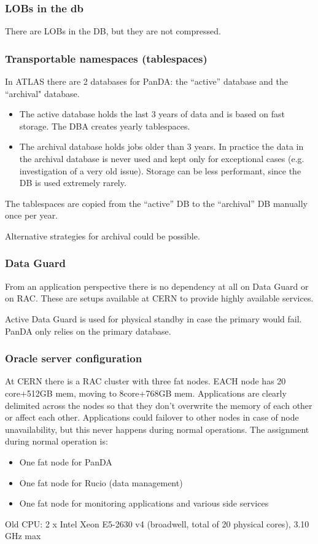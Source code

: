 \subsubsection{LOBs in the db}
There are LOBs in the DB, but they are not compressed.

\subsubsection{Transportable namespaces (tablespaces)}
In ATLAS there are 2 databases for PanDA: the “active” database and the “archival" database.
\begin{itemize}
    \item The active database holds the last 3 years of data and is based on fast storage. The DBA creates yearly tablespaces.
    \item The archival database holds jobs older than 3 years. In practice the data in the archival database is never used and kept only for exceptional cases (e.g. investigation of a very old issue). Storage can be less performant, since the DB is used extremely rarely.
\end{itemize}
The tablespaces are copied from the “active” DB to the “archival” DB manually once per year.

Alternative strategies for archival could be possible.

\subsubsection{Data Guard}
From an application perspective there is no dependency at all on Data Guard or on RAC. These are setups available at CERN to provide highly available services.

Active Data Guard is used for physical standby in case the primary would fail. PanDA only relies on the primary database.

\subsubsection{Oracle server configuration}
At CERN there is a RAC cluster with three fat nodes. EACH node has 20 core+512GB mem, moving to 8core+768GB mem. Applications are clearly delimited across the nodes so that they don’t overwrite the memory of each other or affect each other. Applications could failover to other nodes in case of node unavailability, but this never happens during normal operations. The assignment during normal operation is:
\begin{itemize}
    \item One fat node for PanDA
    \item One fat node for Rucio (data management)
    \item One fat node for monitoring applications and various side services
\end{itemize}
Old CPU: 2 x Intel Xeon E5-2630 v4 (broadwell, total of 20 physical cores), 3.10 GHz max

